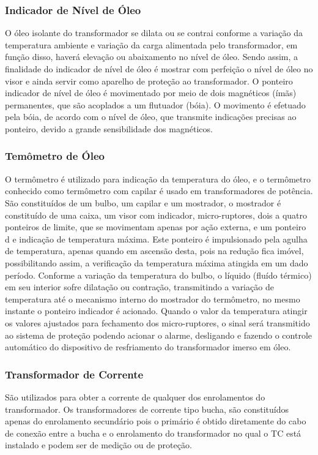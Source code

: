 \documentclass[a5paper]{ufsc-thesis}
\begin{document}
\subsubsection{Indicador de Nível de Óleo}
O óleo isolante do transformador se dilata ou se contrai conforme a variação da temperatura ambiente e variação da carga alimentada pelo transformador, em função disso, haverá elevação ou abaixamento no nível de óleo. Sendo assim, a finalidade do indicador de nível de óleo é mostrar com perfeição o nível de óleo no visor e ainda servir como aparelho de proteção ao transformador. O ponteiro indicador de nível de óleo é movimentado por meio de dois magnéticos (ímãs) permanentes, que são acoplados a um flutuador (bóia). O movimento é efetuado pela bóia, de acordo com o nível de óleo, que transmite indicações precisas ao ponteiro, devido a grande sensibilidade dos magnéticos.

\subsubsection{Temômetro de Óleo}
O termômetro é utilizado para indicação da temperatura do óleo, e o termômetro conhecido como termômetro com capilar é usado em transformadores de potência. São constituídos de um bulbo, um capilar e um mostrador, o mostrador é constituído de uma caixa, um visor com indicador, micro-ruptores, dois a quatro ponteiros de limite, que se movimentam apenas por ação externa, e um ponteiro d e indicação de temperatura máxima. Este ponteiro é impulsionado pela agulha de temperatura, apenas quando em ascensão desta, pois na redução fica imóvel, possibilitando assim, a verificação da temperatura máxima atingida em um dado período. Conforme a variação da temperatura do bulbo, o líquido (fluído térmico) em seu interior sofre dilatação ou contração, transmitindo a variação de temperatura até o mecanismo interno do mostrador do termômetro, no mesmo instante o ponteiro indicador é acionado. Quando o valor da temperatura atingir os valores ajustados para fechamento dos micro-ruptores, o sinal será transmitido ao sistema de proteção podendo acionar o alarme, desligando e fazendo o controle automático do dispositivo de resfriamento do transformador imerso em óleo.

\subsubsection{Transformador de Corrente}
São utilizados para obter a corrente de qualquer dos enrolamentos do transformador. Os transformadores de corrente tipo bucha, são constituídos apenas do enrolamento secundário pois o primário é obtido diretamente do cabo de conexão entre a bucha e o enrolamento do transformador no qual o TC está instalado e podem ser de medição ou de proteção.
\end{document}

